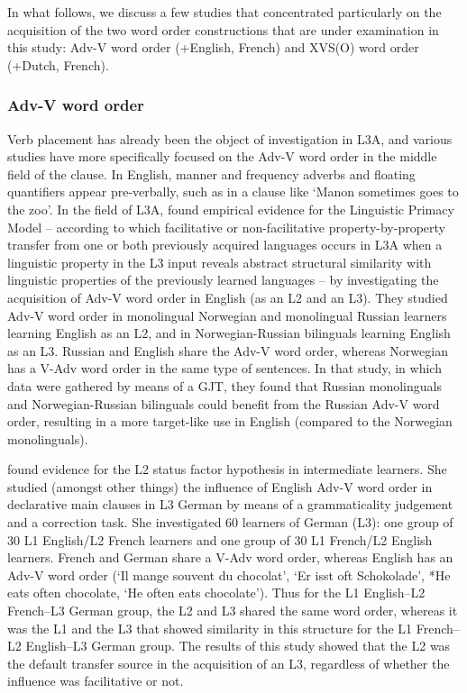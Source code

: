 \documentclass[output=paper]{langsci/langscibook}
\begin{document}
In what follows, we discuss a few studies that concentrated particularly on the acquisition of the two word order constructions that are under examination in this study: Adv-V word order (+English, \textminus French) and XVS(O) word order (+Dutch, \textminus French).

\subsubsection{{Adv-V} {word} {order}}%
\label{sec:stadt:2.2.1}

Verb placement has already been the object of investigation in L3A, and various studies have more specifically focused on the Adv-V word order in the middle field of the clause. In English, manner and frequency adverbs and floating quantifiers appear pre-verbally, such as in a clause like ‘Manon sometimes goes to the zoo’. In the field of L3A, \citet{WestergaardEtAl2016} found empirical evidence for the Linguistic Primacy Model – according to which facilitative or non-facilitative property-by-property transfer from one or both previously acquired languages occurs in L3A when a linguistic property in the L3 input reveals abstract structural similarity with linguistic properties of the previously learned languages – by investigating the acquisition of Adv-V word order in English (as an L2 and an L3). They studied Adv-V word order in monolingual Norwegian and monolingual Russian learners learning English as an L2, and in Norwegian-Russian bilinguals learning English as an L3. Russian and English share the Adv-V word order, whereas Norwegian has a V-Adv word order in the same type of sentences. In that study, in which data were gathered by means of a GJT, they found that Russian monolinguals and Norwegian-Russian bilinguals could benefit from the Russian Adv-V word order, resulting in a more target-like use in English (compared to the Norwegian monolinguals).

  \citet{Falk2010} found evidence for the L2 status factor hypothesis in intermediate learners. She studied (amongst other things) the influence of English Adv-V word order in declarative main clauses in L3 German by means of a grammaticality judgement and a correction task. She investigated 60 learners of German (L3): one group of 30 L1 English/L2 French learners and one group of 30 L1 French/L2 English learners. French and German share a V-Adv word order, whereas English has an Adv-V word order (‘Il mange souvent du chocolat’, ‘Er isst oft Schokolade’, *He eats often chocolate, ‘He often eats chocolate’). Thus for the L1 English–L2 French–L3 German group, the L2 and L3 shared the same word order, whereas it was the L1 and the L3 that showed similarity in this structure for the L1 French–L2 English–L3 German group. The results of this study showed that the L2 was the default transfer source in the acquisition of an L3, regardless of whether the influence was facilitative or not.
\end{document}
